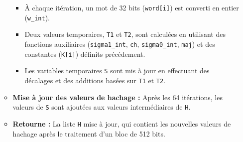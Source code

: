 \documentclass[11pt]{article}
\providecommand{\tightlist}{%
      \setlength{\itemsep}{0pt}\setlength{\parskip}{0pt}}
\begin{document}
\begin{itemize}
\begin{itemize}
    \begin{itemize}
    \tightlist
    \item
      À chaque itération, un mot de 32 bits (\texttt{word{[}i{]}}) est
      converti en entier (\texttt{w\_int}).
    \item
      Deux valeurs temporaires, \texttt{T1} et \texttt{T2}, sont
      calculées en utilisant des fonctions auxiliaires
      (\texttt{sigma1\_int}, \texttt{ch}, \texttt{sigma0\_int},
      \texttt{maj}) et des constantes (\texttt{K{[}i{]}}) définits
      précédement.
    \item
      Les variables temporaires \texttt{S} sont mis à jour en effectuant
      des décalages et des additions basées sur \texttt{T1} et
      \texttt{T2}.
    \end{itemize}
  \item
    \textbf{Mise à jour des valeurs de hachage :} Après les 64
    itérations, les valeurs de \texttt{S} sont ajoutées aux valeurs
    intermédiaires de \texttt{H}.
  \item
    \textbf{Retourne :} La liste \texttt{H} mise à jour, qui contient
    les nouvelles valeurs de hachage après le traitement d'un bloc de
    512 bits.
  \end{itemize}
\end{itemize}
\end{document}
